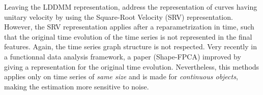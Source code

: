   Leaving the LDDMM representation, \cite{srivastava2010shape,heo2024logistic} address the representation of curves having unitary velocity by using the Square-Root Velocity (SRV) representation.
 However, the SRV representation applies after a reparametrization in time, such that the original time evolution of the time series is not represented in the final features.
  Again, the time series graph structure is not respected.
   Very recently in a functionnal data analysis framework, a paper \cite{wu2024shape} (Shape-FPCA) improved by giving a representation for the original time evolution.
    Nevertheless, this methods applies only on time series of \textit{same size} and is made for \textit{continuous objects}, making the estimation more sensitive to noise.
